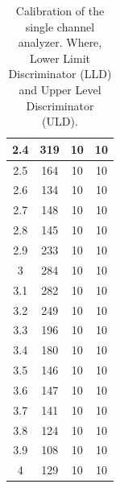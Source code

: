\documentclass[a4paper]{report}
\numberwithin{equation}{section}
\begin{document}
\begin{table}[!ht]
\begin{tabular}{|c|c|c|c|}
        2.4 & 319 & 10 & 10 \\ \hline
        2.5 & 164 & 10 & 10 \\ \hline
        2.6 & 134 & 10 & 10 \\ \hline
        2.7 & 148 & 10 & 10 \\ \hline
        2.8 & 145 & 10 & 10 \\ \hline
        2.9 & 233 & 10 & 10 \\ \hline
        3 & 284 & 10 & 10 \\ \hline
        3.1 & 282 & 10 & 10 \\ \hline
        3.2 & 249 & 10 & 10 \\ \hline
        3.3 & 196 & 10 & 10 \\ \hline
        3.4 & 180 & 10 & 10 \\ \hline
        3.5 & 146 & 10 & 10 \\ \hline
        3.6 & 147 & 10 & 10 \\ \hline
        3.7 & 141 & 10 & 10 \\ \hline
        3.8 & 124 & 10 & 10 \\ \hline
        3.9 & 108 & 10 & 10 \\ \hline
        4 & 129 & 10 & 10 \\ \hline
    \end{tabular}
    \caption{Calibration of the single channel analyzer. Where, Lower Limit Discriminator (LLD) and Upper Level Discriminator (ULD).}
    \label{calibration}
\end{table}
\end{document}
